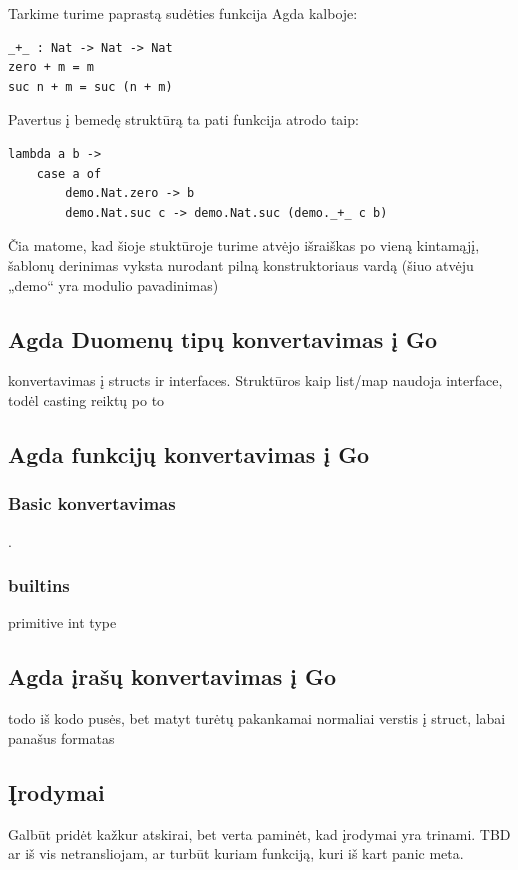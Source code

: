 \documentclass{VUMIFPSkursinis}
\begin{document}
Tarkime turime paprastą sudėties funkcija Agda kalboje:
\begin{lstlisting}
_+_ : Nat -> Nat -> Nat
zero + m = m
suc n + m = suc (n + m)
\end{lstlisting}
Pavertus į bemedę struktūrą ta pati funkcija atrodo taip:
\begin{lstlisting}
lambda a b ->
	case a of
		demo.Nat.zero -> b
		demo.Nat.suc c -> demo.Nat.suc (demo._+_ c b)
\end{lstlisting}
Čia matome, kad šioje stuktūroje turime atvėjo išraiškas po vieną kintamąjį, šablonų derinimas vyksta nurodant pilną konstruktoriaus vardą (šiuo atvėju „demo“ yra modulio pavadinimas)
\subsection{Agda Duomenų tipų konvertavimas į Go}
konvertavimas į structs ir interfaces. Struktūros kaip list/map naudoja interface{}, todėl casting reiktų po to
\subsection{Agda funkcijų konvertavimas į Go}
\subsubsection{Basic konvertavimas}
.
\subsubsection{builtins}
primitive int type
\subsection{Agda įrašų konvertavimas į Go}
todo iš kodo pusės, bet matyt turėtų pakankamai normaliai verstis į struct, labai panašus formatas
\subsection{Įrodymai}
Galbūt pridėt kažkur atskirai, bet verta paminėt, kad įrodymai yra trinami.
TBD ar iš vis netransliojam, ar turbūt kuriam funkciją, kuri iš kart panic meta.
\end{document}
